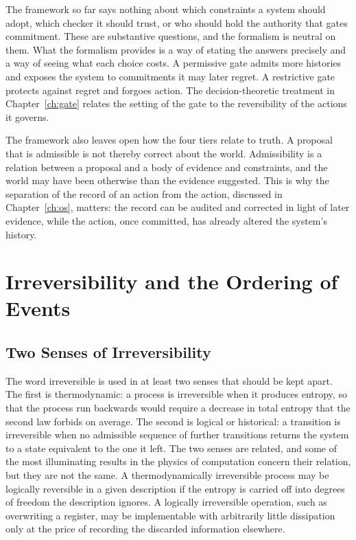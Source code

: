 \documentclass[11pt,twoside,openright]{book}
\theoremstyle{plain}
\theoremstyle{definition}
\theoremstyle{remark}
\begin{document}
The framework so far says nothing about which constraints a system should adopt, which checker it should trust, or who should hold the authority that gates commitment. These are substantive questions, and the formalism is neutral on them. What the formalism provides is a way of stating the answers precisely and a way of seeing what each choice costs. A permissive gate admits more histories and exposes the system to commitments it may later regret. A restrictive gate protects against regret and forgoes action. The decision-theoretic treatment in Chapter~\ref{ch:gate} relates the setting of the gate to the reversibility of the actions it governs.

The framework also leaves open how the four tiers relate to truth. A proposal that is admissible is not thereby correct about the world. Admissibility is a relation between a proposal and a body of evidence and constraints, and the world may have been otherwise than the evidence suggested. This is why the separation of the record of an action from the action, discussed in Chapter~\ref{ch:os}, matters: the record can be audited and corrected in light of later evidence, while the action, once committed, has already altered the system's history.
\chapter{Irreversibility and the Ordering of Events}
\label{ch:irrev}

\section{Two Senses of Irreversibility}

The word irreversible is used in at least two senses that should be kept apart. The first is thermodynamic: a process is irreversible when it produces entropy, so that the process run backwards would require a decrease in total entropy that the second law forbids on average. The second is logical or historical: a transition is irreversible when no admissible sequence of further transitions returns the system to a state equivalent to the one it left. The two senses are related, and some of the most illuminating results in the physics of computation concern their relation, but they are not the same. A thermodynamically irreversible process may be logically reversible in a given description if the entropy is carried off into degrees of freedom the description ignores. A logically irreversible operation, such as overwriting a register, may be implementable with arbitrarily little dissipation only at the price of recording the discarded information elsewhere.
\end{document}
